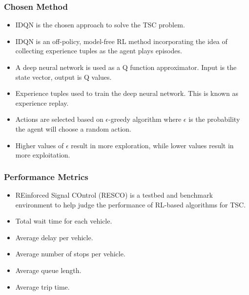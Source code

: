 \documentclass[compress,12pt]{beamer}
\begin{document}
\begin{frame}[bg=arguelles.png]
      \frametitle{Chosen Method}
      \begin{itemize}
      \item IDQN is the chosen approach to solve the TSC problem.
      \item IDQN is an off-policy, model-free RL method incorporating the idea of collecting experience tuples as the agent plays episodes\cite{DBLP:journals/corr/MnihKSGAWR13}.
      \item A deep neural network is used as a Q function approximator. Input is the state vector, output is Q values.
      \item Experience tuples used to train the deep neural network. This is known as experience replay.
      \item Actions are selected based on \(\epsilon\)-greedy algorithm where \(\epsilon\) is the probability the agent will choose a random action\cite{Mnih2015}.
      \item Higher values of \(\epsilon\) result in more exploration, while lower values result in more exploitation.
      \end{itemize}
\end{frame}

\begin{frame}[bg=arguelles.png]
      \frametitle{Performance Metrics}
      \begin{itemize}
      \item REinforced Signal COntrol (RESCO) is a testbed and benchmark environment to help judge the performance of RL-based algorithms for TSC\cite{ault2021reinforcement}.
      \item Total wait time for each vehicle.
      \item Average delay per vehicle.
      \item Average number of stops per vehicle.
      \item Average queue length.
      \item Average trip time\cite{Reza2023}.
      \end{itemize}
\end{frame}

\end{document}
